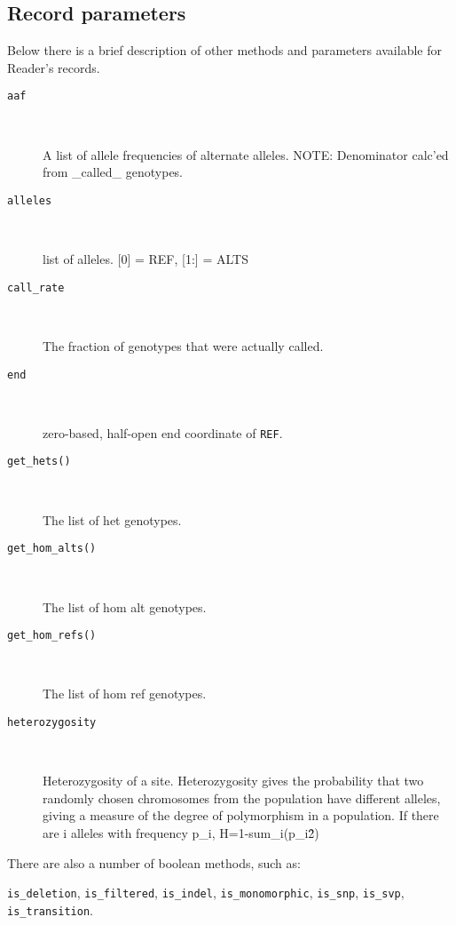 \subsection{Record parameters}

\noindent Below there is a brief description of other methods and parameters available for Reader's records.

\begin{description}
  \item[\texttt{aaf}] \

   A list of allele frequencies of alternate alleles. NOTE: Denominator calc’ed from \_called\_ genotypes.

  \item[\texttt{alleles}] \

   list of alleles. [0] = REF, [1:] = ALTS

  \item[\texttt{call\_rate}] \

  The fraction of genotypes that were actually called.

  \item[\texttt{end}] \

  zero-based, half-open end coordinate of \verb|REF|.

  \item[\texttt{get\_hets()}] \

    The list of het genotypes.

  \item[\texttt{get\_hom\_alts()}] \

    The list of hom alt genotypes.

  \item[\texttt{get\_hom\_refs()}] \

    The list of hom ref genotypes.

  \item[\texttt{heterozygosity}] \

    Heterozygosity of a site. Heterozygosity gives the probability that two randomly chosen chromosomes from the
    population have different alleles, giving a measure of the degree of polymorphism in a population.
    If there are i alleles with frequency p\_i, H=1-sum\_i(p\_i\^2)

\end{description}

\noindent There are also a number of boolean methods, such as:

\verb|is_deletion|, \verb|is_filtered|, \verb|is_indel|, \verb|is_monomorphic|, \verb|is_snp|, \verb|is_svp|, \verb|is_transition|.

